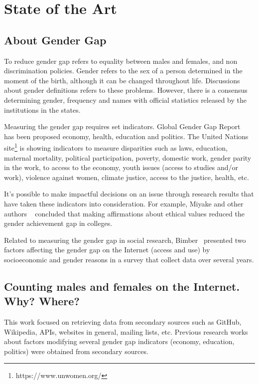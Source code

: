 \documentclass[a4paper]{article}
\begin{document}
\section{State of the Art}
\label{sec:stateofart}

\subsection{About Gender Gap}

To reduce gender gap refers to equality between males and females,
and non discrimination policies. Gender refers to the sex of a person
determined in the moment of the birth, although it can be changed
throughout life. Discussions about gender definitions refers to these
problems. However, there is a consensus determining gender, frequency
and names with official statistics released by the institutions in the
states.

Measuring the gender gap requires set indicators. Global Gender Gap
Report~\cite{chancel2022world} has been proposed economy, health,
education and politics. The United Nations
site\footnote{https://www.unwomen.org/} is showing indicators
to measure disparities such as laws, education, maternal mortality,
political participation, poverty, domestic work, gender parity in
the work, to access to the economy, youth issues (access to
studies and/or work), violence against women, climate justice,
access to the justice, health, etc.

It's possible to make impactful decisions on an issue through research
results that have taken these indicators into consideration. For example,
Miyake and other authors ~\cite{miyake2010reducing} concluded that making
affirmations about ethical values reduced the gender achievement gap in colleges.

Related to measuring the gender gap in social research,
Bimber~\cite{bimber2000measuring} presented two factors affecting
the gender gap on the Internet (access and use) by socioeconomic and gender
reasons in a survey that collect data over several years.

\subsection{Counting males and females on the Internet. Why? Where?}

This work focused on retrieving data from secondary sources such as
GitHub, Wikipedia, APIs, websites in general, mailing lists, etc.
Previous research works about factors modifying several gender gap
indicators (economy, education, politics) were obtained from secondary
sources.
\end{document}
